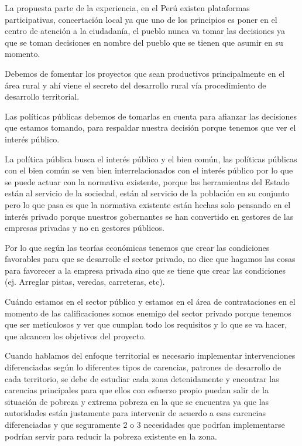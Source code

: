 \documentclass[
  letterpaper,
  DIV=11,
  numbers=noendperiod]{scrartcl}
\begin{document}
La propuesta parte de la experiencia, en el Perú existen plataformas
participativas, concertación local ya que uno de los principios es poner
en el centro de atención a la ciudadanía, el pueblo nunca va tomar las
decisiones ya que se toman decisiones en nombre del pueblo que se tienen
que asumir en su momento.

Debemos de fomentar los proyectos que sean productivos principalmente en
el área rural y ahí viene el secreto del desarrollo rural vía
procedimiento de desarrollo territorial.

Las políticas públicas debemos de tomarlas en cuenta para afianzar las
decisiones que estamos tomando, para respaldar nuestra decisión porque
tenemos que ver el interés público.

La política pública busca el interés público y el bien común, las
políticas públicas con el bien común se ven bien interrelacionados con
el interés público por lo que se puede actuar con la normativa
existente, porque las herramientas del Estado están al servicio de la
sociedad, están al servicio de la población en su conjunto pero lo que
pasa es que la normativa existente están hechas solo pensando en el
interés privado porque nuestros gobernantes se han convertido en
gestores de las empresas privadas y no en gestores públicos.

Por lo que según las teorías económicas tenemos que crear las
condiciones favorables para que se desarrolle el sector privado, no dice
que hagamos las cosas para favorecer a la empresa privada sino que se
tiene que crear las condiciones (ej. Arreglar pistas, veredas,
carreteras, etc).

Cuándo estamos en el sector público y estamos en el área de
contrataciones en el momento de las calificaciones somos enemigo del
sector privado porque tenemos que ser meticulosos y ver que cumplan todo
los requisitos y lo que se va hacer, que alcancen los objetivos del
proyecto.

Cuando hablamos del enfoque territorial es necesario implementar
intervenciones diferenciadas según lo diferentes tipos de carencias,
patrones de desarrollo de cada territorio, se debe de estudiar cada zona
detenidamente y encontrar las carencias principales para que ellos con
esfuerzo propio puedan salir de la situación de pobreza y extrema
pobreza en la que se encuentra ya que las autoridades están justamente
para intervenir de acuerdo a esas carencias diferenciadas y que
seguramente 2 o 3 necesidades que podrían implementarse podrían servir
para reducir la pobreza existente en la zona.
\end{document}
